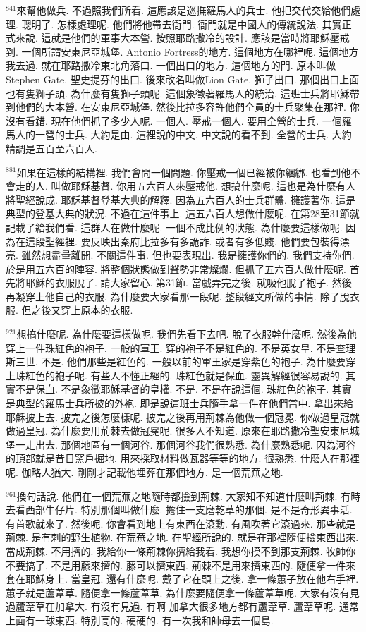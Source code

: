 \documentclass{book}
\begin{document}
$^{841}$來幫他做兵.
不過照我們所看.
這應該是巡撫羅馬人的兵士.
他把交代交給他們處理.
聰明了.
怎樣處理呢.
他們將他帶去衙門.
衙門就是中國人的傳統說法.
其實正式來說.
這就是他們的軍事大本營.
按照耶路撒冷的設計.
應該是當時將耶穌壓戒到.
一個所謂安東尼亞城堡.
Antonio Fortress的地方.
這個地方在哪裡呢.
這個地方我去過.
就在耶路撒冷東北角落口.
一個出口的地方.
這個地方的門.
原本叫做Stephen Gate.
聖史提芬的出口.
後來改名叫做Lion Gate.
獅子出口.
那個出口上面也有隻獅子頭.
為什麼有隻獅子頭呢.
這個象徵著羅馬人的統治.
這班士兵將耶穌帶到他們的大本營.
在安東尼亞城堡.
然後比拉多容許他們全員的士兵聚集在那裡.
你沒有看錯.
現在他們抓了多少人呢.
一個人.
壓戒一個人.
要用全營的士兵.
一個羅馬人的一營的士兵.
大約是由.
這裡說的中文.
中文說的看不到.
全營的士兵.
大約精調是五百至六百人.

$^{881}$如果在這樣的結構裡.
我們會問一個問題.
你壓戒一個已經被你綑綁.
也看到他不會走的人.
叫做耶穌基督.
你用五六百人來壓戒他.
想搞什麼呢.
這也是為什麼有人將聖經說成.
耶穌基督登基大典的解釋.
因為五六百人的士兵群體.
擁護著你.
這是典型的登基大典的狀況.
不過在這件事上.
這五六百人想做什麼呢.
在第28至31節就記載了給我們看.
這群人在做什麼呢.
一個不成比例的狀態.
為什麼要這樣做呢.
因為在這段聖經裡.
要反映出秦府比拉多有多詭詐.
或者有多低賤.
他們要包裝得漂亮.
雖然想盡量離開.
不關這件事.
但也要表現出.
我是擁護你們的.
我們支持你們.
於是用五六百的陣容.
將整個狀態做到聲勢非常燦爛.
但抓了五六百人做什麼呢.
首先將耶穌的衣服脫了.
請大家留心.
第31節.
當戲弄完之後.
就吸他脫了袍子.
然後再凝穿上他自己的衣服.
為什麼要大家看那一段呢.
整段經文所做的事情.
除了脫衣服.
但之後又穿上原本的衣服.

$^{921}$想搞什麼呢.
為什麼要這樣做呢.
我們先看下去吧.
脫了衣服幹什麼呢.
然後為他穿上一件珠紅色的袍子.
一般的軍王.
穿的袍子不是紅色的.
不是英女皇.
不是查理斯三世.
不是.
他們那些是紅色的.
一般以前的軍王家是穿紫色的袍子.
為什麼要穿上珠紅色的袍子呢.
有些人不懂正經的.
珠紅色就是保血.
靈異解經很容易說的.
其實不是保血.
不是象徵耶穌基督的皇權.
不是.
不是在說這個.
珠紅色的袍子.
其實是典型的羅馬士兵所披的外袍.
即是說這班士兵隨手拿一件在他們當中.
拿出來給耶穌披上去.
披完之後怎麼樣呢.
披完之後再用荊棘為他做一個冠冕.
你做過皇冠就做過皇冠.
為什麼要用荊棘去做冠冕呢.
很多人不知道.
原來在耶路撒冷聖安東尼城堡一走出去.
那個地區有一個河谷.
那個河谷我們很熟悉.
為什麼熟悉呢.
因為河谷的頂部就是昔日窯戶掘地.
用來採取材料做瓦器等等的地方.
很熟悉.
什麼人在那裡呢.
伽略人猶大.
剛剛才記載他埋葬在那個地方.
是一個荒蕪之地.

$^{961}$換句話說.
他們在一個荒蕪之地隨時都撿到荊棘.
大家知不知道什麼叫荊棘.
有時去看西部牛仔片.
特別那個叫做什麼.
擔住一支磨乾草的那個.
是不是奇形異事活.
有首歌就來了.
然後呢.
你會看到地上有東西在滾動.
有風吹著它滾過來.
那些就是荊棘.
是有刺的野生植物.
在荒蕪之地.
在聖經所說的.
就是在那裡隨便撿東西出來.
當成荊棘.
不用擠的.
我給你一條荊棘你擠給我看.
我想你摸不到那支荊棘.
牧師你不要搞了.
不是用藤來擠的.
藤可以擠東西.
荊棘不是用來擠東西的.
隨便拿一件來套在耶穌身上.
當皇冠.
還有什麼呢.
戴了它在頭上之後.
拿一條蕙子放在他右手裡.
蕙子就是蘆葦草.
隨便拿一條蘆葦草.
為什麼要隨便拿一條蘆葦草呢.
大家有沒有見過蘆葦草在加拿大.
有沒有見過.
有啊 加拿大很多地方都有蘆葦草.
蘆葦草呢.
通常上面有一球東西.
特別高的.
硬硬的.
有一次我和師母去一個島.
\end{document}
